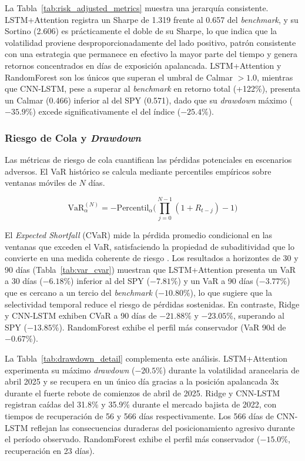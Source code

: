 La Tabla~\ref{tab:risk_adjusted_metrics} muestra una jerarqu\'ia consistente. LSTM+Attention registra un Sharpe de 1.319 frente al 0.657 del \textit{benchmark}, y su Sortino (2.606) es pr\'acticamente el doble de su Sharpe, lo que indica que la volatilidad proviene desproporcionadamente del lado positivo, patr\'on consistente con una estrategia que permanece en efectivo la mayor parte del tiempo y genera retornos concentrados en d\'ias de exposici\'on apalancada. LSTM+Attention y RandomForest son los \'unicos que superan el umbral de Calmar $> 1.0$, mientras que CNN-LSTM, pese a superar al \textit{benchmark} en retorno total (+122\%), presenta un Calmar (0.466) inferior al del SPY (0.571), dado que su \textit{drawdown} m\'aximo ($-35.9\%$) excede significativamente el del \'indice ($-25.4\%$).

\subsubsection{Riesgo de Cola y \textit{Drawdown}}
\label{subsec:var_cvar}

Las m\'etricas de riesgo de cola cuantifican las p\'erdidas potenciales en escenarios adversos. El VaR hist\'orico se calcula mediante percentiles emp\'iricos sobre ventanas m\'oviles de $N$ d\'ias.

\begin{equation}
\text{VaR}_{\alpha}^{(N)} = -\text{Percentil}_{\alpha}\Big(\prod_{j=0}^{N-1}(1 + R_{t-j}) - 1\Big)
\label{eq:var}
\end{equation}

El \textit{Expected Shortfall} (CVaR) mide la p\'erdida promedio condicional en las ventanas que exceden el VaR, satisfaciendo la propiedad de subaditividad que lo convierte en una medida coherente de riesgo \citep{lopezdeprado2018}. Los resultados a horizontes de 30 y 90 d\'ias (Tabla~\ref{tab:var_cvar}) muestran que LSTM+Attention presenta un VaR a 30 d\'ias ($-6.18\%$) inferior al del SPY ($-7.81\%$) y un VaR a 90 d\'ias ($-3.77\%$) que es cercano a un tercio del \textit{benchmark} ($-10.80\%$), lo que sugiere que la selectividad temporal reduce el riesgo de p\'erdidas sostenidas. En contraste, Ridge y CNN-LSTM exhiben CVaR a 90 d\'ias de $-21.88\%$ y $-23.05\%$, superando al SPY ($-13.85\%$). RandomForest exhibe el perfil m\'as conservador (VaR 90d de $-0.67\%$).

La Tabla~\ref{tab:drawdown_detail} complementa este an\'alisis. LSTM+Attention experimenta su m\'aximo \textit{drawdown} ($-20.5\%$) durante la volatilidad arancelaria de abril 2025 y se recupera en un \'unico d\'ia gracias a la posici\'on apalancada 3x durante el fuerte rebote de comienzos de abril de 2025. Ridge y CNN-LSTM registran ca\'idas del 31.8\% y 35.9\% durante el mercado bajista de 2022, con tiempos de recuperaci\'on de 56 y 566 d\'ias respectivamente. Los 566 d\'ias de CNN-LSTM reflejan las consecuencias duraderas del posicionamiento agresivo durante el per\'iodo observado. RandomForest exhibe el perfil m\'as conservador ($-15.0\%$, recuperaci\'on en 23 d\'ias).

